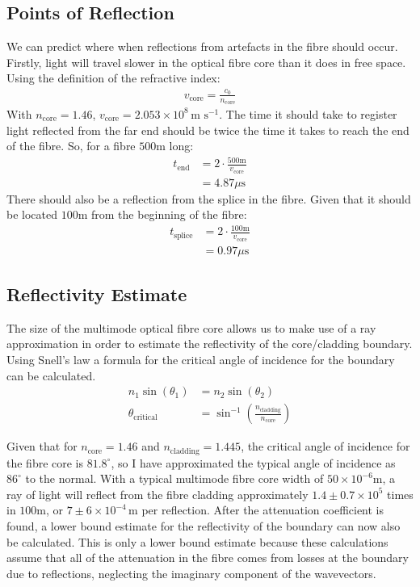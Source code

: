 \subsection{Points of Reflection}
We can predict where when reflections from artefacts in the fibre should occur.
Firstly, light will travel slower in the optical fibre core than it does in free space. Using the definition of the refractive index:
\begin{align}
	v_{\text{core}} = \frac{c_0}{n_{\text{core}}} 
	\label{eq:velocity}
\end{align}
With $n_{\text{core}} = 1.46$, $v_{\text{core}} = 2.053 \times 10^8 \,\text{m s}^{-1}$.
The time it should take to register light reflected from the far end
should be twice the time it takes to reach the end of the fibre.
So, for a fibre $500$m long:
\begin{align*}
	t_{\text{end}} &= 2\cdot \frac{500 \text{m}}{v_{\text{core}}}	\\
		&= 4.87 \mu\text{s}
\end{align*}
There should also be a reflection from the splice in the fibre. Given that it should be located $100$m from the beginning of the fibre:
\begin{align*}
	t_{\text{splice}} &= 2\cdot \frac{100 \text{m}}{v_{\text{core}}}	\\
		&= 0.97 \mu\text{s}
\end{align*}

\subsection{Reflectivity Estimate}
The size of the multimode optical fibre core allows us to make use of a ray approximation in order to estimate the reflectivity of the core/cladding boundary.
Using Snell's law a formula for the critical angle of incidence for the boundary can be calculated.
\begin{align*}
	n_1 \sin(\theta_1) &= n_2 \sin(\theta_2)	\\
	\theta_\text{critical} &= \sin^{-1}\left(\frac{n_{\text{cladding}}}{n_{\text{core}}}\right)
\end{align*}

Given that for $n_\text{core} = 1.46$ and $n_\text{cladding} = 1.445$, the critical angle of incidence for the fibre core is $81.8^{\circ}$, so I have approximated the typical angle of incidence as $86^{\circ}$ to the normal. With a typical multimode fibre core width of $50\times 10^{-6}\text{m}$, a ray of light will reflect from the fibre cladding approximately 
$1.4 \pm 0.7 \times 10^{5}$ times in $100\text{m}$,
or $7 \pm 6 \times 10^{-4} \, \text{m}$ per reflection.
After the attenuation coefficient is found, a lower bound estimate for the reflectivity of the boundary can now also be calculated.
This is only a lower bound estimate because these calculations assume that all of the attenuation in the fibre comes from losses at the boundary due to reflections, neglecting the imaginary component of the wavevectors.
